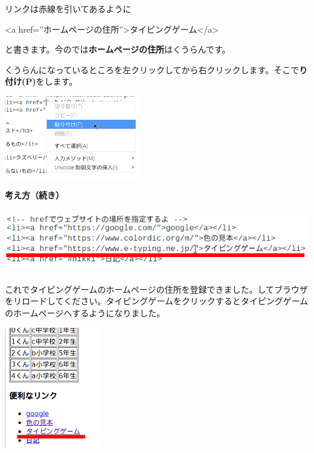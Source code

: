 \documentclass[a4paper,12pt]{jarticle}
\begin{document}
\bigskip
\flushleft

リンクは赤線を引いてあるように

{\textless}a
href=”ホームページの住所”{\textgreater}タイピングゲーム{\textless}/a{\textgreater}

と書きます。今のでは\textbf{ホームページの住所}はくうらんです。

くうらんになっているところを左クリックしてから右クリックします。そこで\textbf{り付け(P)}をします。





\centering
\includegraphics[width=5.992cm,height=3.577cm]{textbook-img199.png}

\clearpage
\flushleft
\textbf{考え方（続き）}


\bigskip

\centering
\includegraphics[width=15.953cm,height=2.746cm]{textbook-img200.png}

\bigskip
\flushleft

これでタイピングゲームのホームページの住所を登録できました。してブラウザをリロードしてください。タイピングゲームをクリックするとタイピングゲームのホームページへするようになりました。


\bigskip
\centering
\includegraphics[width=4.235cm,height=5.276cm]{textbook-img201.png}
\end{document}
